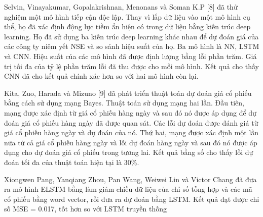 Selvin, Vinayakumar, Gopalakrishnan, Menonans và Soman K.P [8] đã thử nghiệm một mô hình tiếp cận độc lập. Thay vì lắp dữ liệu vào một mô hình cụ thể, họ đã xác định động lực tiềm ẩn hiện có trong dữ liệu bằng kiến trúc deep learning. Họ đã sử dụng ba kiến trúc deep learning khác nhau để dự đoán giá của các công ty niêm yết NSE và so sánh hiệu suất của họ. Ba mô hình là NN, LSTM và CNN. Hiệu suất của các mô hình đã được định lượng bằng lỗi phần trăm. Giá trị tối đa của tỷ lệ phần trăm lỗi đã thu được cho mỗi mô hình. Kết quả cho thấy CNN đã cho kết quả chính xác hơn so với hai mô hình còn lại.

Kita, Zuo, Harada và Mizuno [9] đã phát triển thuật toán dự đoán giá cổ phiếu bằng cách sử dụng mạng Bayes. Thuật toán sử dụng mạng hai lần. Đầu tiên, mạng được xác định từ giá cổ phiếu hàng ngày và sau đó nó được áp dụng để dự đoán giá cổ phiếu hàng ngày đã được quan sát. Các lỗi dự đoán được đánh giá từ giá cổ phiếu hàng ngày và dự đoán của nó. Thứ hai, mạng được xác định một lần nữa từ cả giá cổ phiếu hàng ngày và lỗi dự đoán hàng ngày và sau đó nó được áp dụng cho dự đoán giá cổ phiếu trong tương lai. Kết quả bằng số cho thấy lỗi dự đoán tối đa của thuật toán hiện tại là 30\%.


Xiongwen Pang, Yanqiang Zhou, Pan Wang, Weiwei Lin và Victor Chang đã đưa ra mô hình ELSTM bằng làm giảm chiều dữ liệu của chỉ số tỗng hợp và các mã cổ phiếu bằng word vector, rồi đưa ra dự đoán bằng LSTM. Kết quả đạt được chỉ số MSE = 0.017, tốt hơn so với LSTM truyền thống

